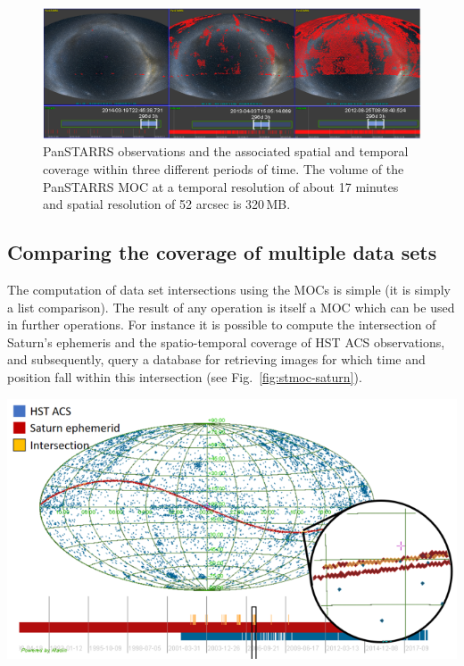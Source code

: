 \documentclass[11pt,a4paper]{ivoa}
\begin{document}
\begin{figure}[!ht]
\begin{center}
\includegraphics[width=\textwidth]{panstarrs.png}
\caption{PanSTARRS observations and the associated spatial and
  temporal coverage within three different periods of time.
  The volume of the PanSTARRS MOC at a temporal resolution
  of about 17 minutes and spatial resolution of 52 arcsec is 320\,MB.}
\label{fig:panstarrs}
\end{center}
\end{figure}

\subsection{Comparing the coverage of multiple data sets}
The computation of data set intersections using the MOCs is simple (it
is simply a list comparison). The result of any operation is itself a
MOC which can be used in further operations. For instance it is
possible to compute the intersection of Saturn's ephemeris and
the spatio-temporal coverage of HST ACS observations, and subsequently,
query a database for retrieving images for which time and position
fall within this intersection (see Fig.~\ref{fig:stmoc-saturn}). 

\begin{adjustbox}{center,caption={Intersection of HST ACS observations
      and Saturn ephemeris Space-Time-MOC},label={fig:stmoc-saturn},
    nofloat=figure,vspace=\bigskipamount}
\includegraphics[width=\textwidth]{stmoc_op.png}
\end{adjustbox}
\end{document}
